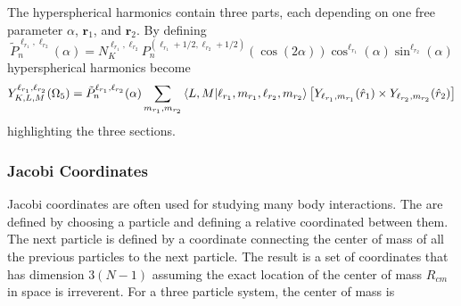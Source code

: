The hyperspherical harmonics contain three parts, each depending on one free parameter $\alpha$, $\mathbf{r}_1$, and $\mathbf{r}_2$. By defining 
\begin{equation}
    \tilde{P}^{\ell_{r_1},\ell_{r_2}}_{n}(\alpha) = N^{\ell_{r_1},\ell_{r_2}}_K P_n^{(\ell_{r_1}+1/2,\ell_{r_2}+1/2)}(\cos(2\alpha)) \cos^{\ell_{r_1}}(\alpha) \sin^{\ell_{r_2}}(\alpha) 
\end{equation}
hyperspherical harmonics become
\begin{equation}
    Y^{\ell_{r_1},\ell_{r_2}}_{K,L,M}(\Omega_{5}) =\tilde{P}^{\ell_{r_1},\ell_{r_2}}_{n}(\alpha)\sum_{m_{r_1},m_{r_2}}\bra{L,M}\ket{\ell_{r_1},m_{r_1},\ell_{r_2},m_{r_2}}  \left[Y_{\ell_{r_1},m_{r_1}}(\hat{r}_1)\times Y_{\ell_{r_2},m_{r_2}}(\hat{r}_2)\right]
    \label{eq:hyperspherical_harm_simple}
\end{equation}
highlighting the three sections.
 
\subsubsection{Jacobi Coordinates} %
\label{ssub:jacobi_coordinates}
Jacobi coordinates are often used for studying many body interactions. The are defined by choosing a particle and defining a relative coordinated between them. The next particle is defined by a coordinate connecting the center of mass of all the previous particles to the next particle. The result is a set of coordinates that has dimension $3(N-1)$ assuming the exact location of the center of mass $R_{cm}$ in space is irreverent. 
For a three particle system, the center of mass is

